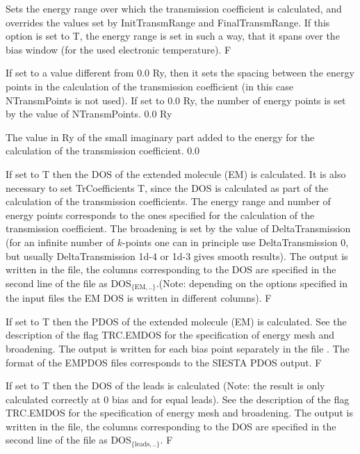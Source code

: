\documentclass[11pt]{article}
\begin{document}
{
{Sets the energy range over which the transmission coefficient is calculated, and overrides the values set by InitTransmRange and FinalTransmRange. If this option is set to T, the energy range is set in such a way, that it spans over the bias window (for the used electronic temperature).}
{F}

{If set to a value different from 0.0 Ry, then it sets the spacing between the energy points in the calculation of the transmission coefficient (in this case NTransmPoints is not used). If set to 0.0 Ry, the number of energy points is set by the value of NTransmPoints.}
{0.0 Ry}

{The value in Ry of the small imaginary part added to the energy for the calculation of the transmission coefficient.}
{0.0}



{If set to T then the DOS of the extended molecule (EM) is calculated. It is also necessary to set TrCoefficients T, since the DOS is calculated as part of the calculation of the transmission coefficients. The energy range and number of energy points corresponds to the ones specified for the calculation of the transmission coefficient. The broadening is set by the value of DeltaTransmission (for an infinite number of $k$-points one can in principle use DeltaTransmission 0, but usually DeltaTransmission 1d-4 or 1d-3 gives smooth results). The output is written in the  file, the columns corresponding to the DOS are specified in the second line of the  file as DOS$_\mathrm{\lbrace EM,..\rbrace}$.(Note: depending on the options specified in the input files the EM DOS is written in different columns).}
{F}

{If set to T then the PDOS of the extended molecule (EM) is calculated. See the description of the flag TRC.EMDOS for the specification of energy mesh and broadening. The output is written for each bias point separately in the file . The format of the EMPDOS files corresponds to the SIESTA PDOS output.}
{F}


{If set to T then the DOS of the leads is calculated (Note: the result is only calculated correctly at 0 bias and for equal leads). See the description of the flag TRC.EMDOS for the specification of energy mesh and broadening. The output is written in the  file, the columns corresponding to the DOS are specified in the second line of the  file as DOS$_\mathrm{\lbrace leads,..\rbrace}$.}
{F}


}
\end{document}
